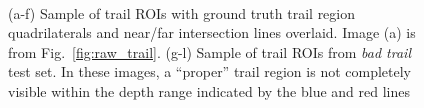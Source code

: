 \documentclass[letterpaper, 10 pt, conference]{ieeeconf}  %
\begin{document}
\begin{figure}[!t]
\\
\vspace{-0.06in}
\caption{(a-f) Sample of trail ROIs with ground truth trail region quadrilaterals and near/far
  intersection lines overlaid.  Image (a) is from Fig.~\ref{fig:raw_trail}.  (g-l) Sample of trail ROIs from
  \textit{bad trail} test set.  In these images, a ``proper'' trail region is not completely visible within the depth range indicated by the blue and red lines}
\label{fig:nearfar_explainer}
\end{figure}
\end{document}
